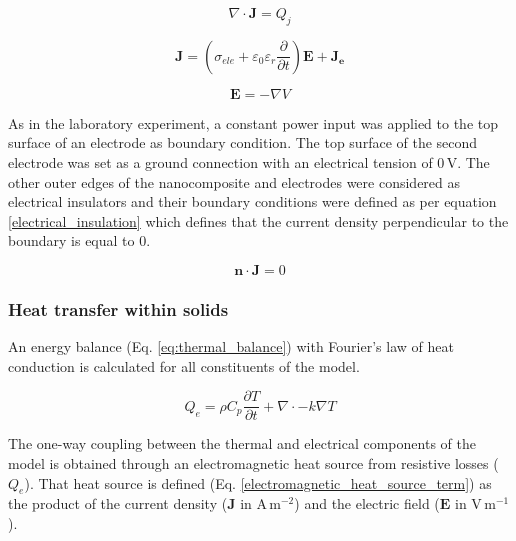 \documentclass[review,times,sagev,doublespace]{sagej}
\begin{document}
\begin{equation}
\nabla \cdot \mathbf{J} = Q_j
\label{eq:current_conservation_1}
\end{equation}

\begin{equation}
\mathbf{J} = \left( \sigma_{ele} + \varepsilon_0 \varepsilon_r \frac{\partial}{\partial t} \right) \mathbf{E} + \mathbf{J_e}
\label{eq:current_conservation_2}
\end{equation}

\begin{equation}
\mathbf{E} = - \nabla V
\label{eq:current_conservation_3}
\end{equation}

As in the laboratory experiment, a constant power input was applied to the top surface of an electrode as boundary condition. 
The top surface of the second electrode was set as a ground connection with an electrical tension of 0\,V. 
The other outer edges of the nanocomposite and electrodes were considered as electrical insulators and their boundary conditions were defined as per equation \ref{electrical_insulation} which defines that the current density perpendicular to the boundary is equal to 0. 

\begin{equation}
\mathbf{n} \cdot \mathbf{J} = 0
\label{electrical_insulation}
\end{equation}

		\subsubsection{Heat transfer within solids}

An energy balance (Eq. \ref{eq:thermal_balance}) with Fourier’s law of heat conduction is calculated for all constituents of the model. 

\begin{equation}
Q_e= \rho C_p \frac{\partial T}{\partial t} + \nabla \cdot -k \nabla T
\label{eq:thermal_balance}
\end{equation}

The one-way coupling between the thermal and electrical components of the model is obtained through an electromagnetic heat source from resistive losses ($Q_e$).  
That heat source is defined (Eq. \ref{electromagnetic_heat_source_term}) as the product of the current density ($\mathbf{J}$ in \mbox{A\,m$^{-2}$}) and the electric field ($\mathbf{E}$ in \mbox{V\,m$^{-1}$}). 
\end{document}
